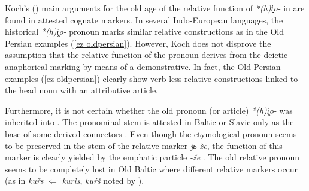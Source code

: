 Koch's (\citeyear[53, passim]{koch1992}) main arguments for the old age of the relative function of \textit{*(h)i̭o-} in  are found in attested cognate markers. In several Indo-European languages, the historical \textit{*(h)i̭o-} pronoun marks similar relative constructions as in the Old Persian examples (\ref{ez oldpersian}). However, Koch does not disprove the assumption that the relative function of the pronoun derives from the deictic-anaphorical marking by means of a demonstrative. In fact, the Old Persian examples (\ref{ez oldpersian}) clearly show verb-less relative constructions linked to the head noun with an attributive article.

Furthermore, it is not certain whether the old pronoun (or article) \textit{*(h)i̭o-} was inherited into . The pronominal stem is attested in Baltic or Slavic only as the base of some derived connectors \citep[56]{heinrichs1954}. Even though the etymological pronoun seems to be preserved in the stem of the  relative marker \textit{jь-že}, the function of this marker is clearly yielded by the emphatic particle \textit{-že} \citep[56]{heinrichs1954}. %
 The old relative pronoun seems to be completely lost in Old Baltic where different relative markers occur (as in  \textit{ku\~rs} $\Leftarrow$ \textit{kurìs},  \textit{kuŕš} noted by \citealt[15]{schmidt1959}).

